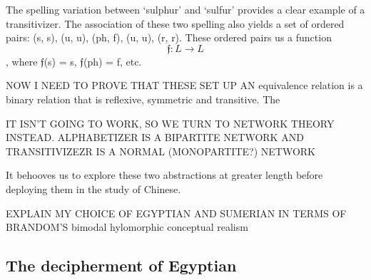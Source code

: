 The spelling variation between `sulphur' and `sulfur'  provides a clear example of a transitivizer. The association of these two spelling also yields a set of ordered pairs: (s, s), (u, u), (ph, f), (u, u), (r, r). 
These ordered pairs us a function 
\begin{equation}
\mathfrak{f}
: L \longrightarrow L 
\end{equation},
where 
$\mathfrak{f}$(s) = s, 
$\mathfrak{f}$(ph) = f, etc.



NOW I NEED TO PROVE THAT THESE SET UP AN 
equivalence relation is a binary relation that is reflexive, symmetric and transitive. The

IT ISN'T GOING TO WORK, SO WE TURN TO NETWORK THEORY INSTEAD. ALPHABETIZER IS A BIPARTITE NETWORK AND TRANSITIVIZEZR IS A NORMAL (MONOPARTITE?) NETWORK

It behooves us to explore these two abstractions at greater length before deploying them in the study of Chinese. 

EXPLAIN MY CHOICE OF EGYPTIAN AND SUMERIAN 
IN TERMS OF BRANDOM'S bimodal hylomorphic conceptual realism 

\subsection{The decipherment of Egyptian}

